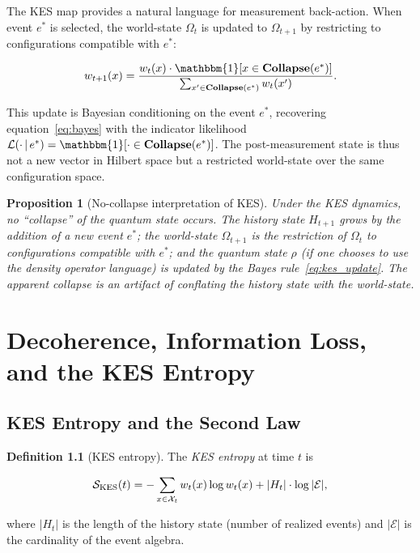 \documentclass[11pt, openright, twoside]{book}
\theoremstyle{plain}
\newtheorem{proposition}[theorem]{Proposition}
\theoremstyle{definition}
\newtheorem{definition}[theorem]{Definition}
\theoremstyle{remark}
\newcommand{\Collapse}{\mathbf{Collapse}}
\newcommand{\given}{\,|\,}
\begin{document}
The KES map provides a natural language for measurement back-action. When event $e^*$ is
selected, the world-state $\Omega_t$ is updated to $\Omega_{t+1}$ by restricting to
configurations compatible with $e^*$:

\begin{equation}
  w_{t+1}(x) = \frac{w_t(x)\cdot\mathbbm{1}[x \in \Collapse(e^*)]}{\sum_{x' \in \Collapse(e^*)} w_t(x')}.
  \label{eq:kes_update}
\end{equation}

This update is Bayesian conditioning on the event $e^*$, recovering equation~\eqref{eq:bayes}
with the indicator likelihood $\mathcal{L}(\cdot\given e^*) = \mathbbm{1}[\cdot \in \Collapse(e^*)]$.
The post-measurement state is thus not a new vector in Hilbert space but a restricted
world-state over the same configuration space.

\begin{proposition}[No-collapse interpretation of KES]
\label{prop:no_collapse}
Under the KES dynamics, no ``collapse'' of the quantum state occurs. The history state
$H_{t+1}$ grows by the addition of a new event $e^*$; the world-state $\Omega_{t+1}$
is the restriction of $\Omega_t$ to configurations compatible with $e^*$; and the
quantum state $\rho$ (if one chooses to use the density operator language) is updated
by the Bayes rule~\eqref{eq:kes_update}. The apparent collapse is an artifact of
conflating the history state with the world-state.
\end{proposition}

\chapter{Decoherence, Information Loss, and the KES Entropy}

\section{KES Entropy and the Second Law}

\begin{definition}[KES entropy]
\label{def:kes_entropy}
The \emph{KES entropy} at time $t$ is

\begin{equation}
  \mathcal{S}_{\rm KES}(t) = -\sum_{x \in \mathcal{X}_t} w_t(x)\log w_t(x)
  + |H_t|\cdot\log|\mathcal{E}|,
  \label{eq:kes_entropy}
\end{equation}

where $|H_t|$ is the length of the history state (number of realized events) and
$|\mathcal{E}|$ is the cardinality of the event algebra.
\end{definition}
\end{document}
